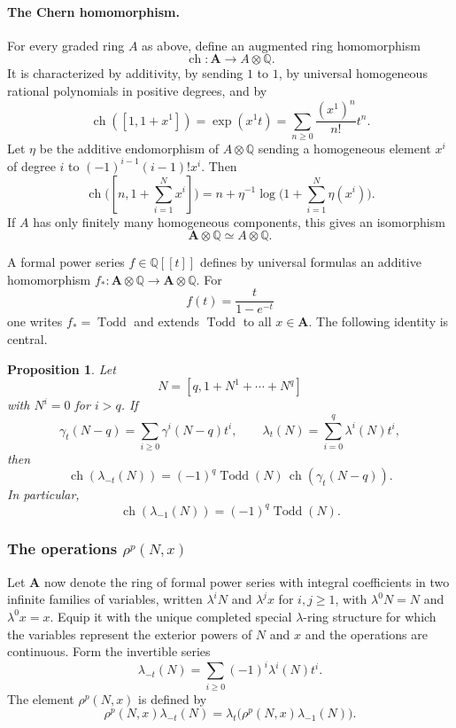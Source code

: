 \documentclass[11pt]{article}
\theoremstyle{plain}
\newtheorem*{proposition*}{Proposition}
\theoremstyle{definition}
\theoremstyle{remark}
\newcommand{\QQ}{\mathbb Q}
\providecommand{\ch}{\operatorname{ch}}
\providecommand{\Todd}{\operatorname{Todd}}
\begin{document}
\paragraph{The Chern homomorphism.}
For every graded ring $A$ as above, define an augmented ring homomorphism
\begin{equation}\label{eq:chernhom}
   \ch:\mathbf A\to A\otimes\QQ.
\end{equation}
It is characterized by additivity, by sending $1$ to $1$, by universal homogeneous rational polynomials in positive degrees, and by
\begin{equation}\label{eq:chlinear}
   \ch([1,1+x^1])=\exp(x^1t)=\sum_{n\geq0}\frac{(x^1)^n}{n!}t^n.
\end{equation}
Let $\eta$ be the additive endomorphism of $A\otimes\QQ$ sending a homogeneous element $x^i$ of degree $i$ to $(-1)^{i-1}(i-1)!x^i$. Then
\begin{equation}\label{eq:chexplicit}
   \ch\bigl([n,1+\sum_{i=1}^{N}x^i]\bigr)
   =n+\eta^{-1}\log\bigl(1+\sum_{i=1}^{N}\eta(x^i)\bigr).
\end{equation}
If $A$ has only finitely many homogeneous components, this gives an isomorphism
\[
   \mathbf A\otimes\QQ\simeq A\otimes\QQ.
\]

A formal power series $f\in\QQ[[t]]$ defines by universal formulas an additive homomorphism $f_*:\mathbf A\otimes\QQ\to\mathbf A\otimes\QQ$. For
\[
   f(t)=\frac{t}{1-e^{-t}}
\]
one writes $f_* = \Todd$ and extends $\Todd$ to all $x\in\mathbf A$. The following identity is central.

\begin{proposition*}
Let
\[
   N=[q,1+N^1+\cdots+N^q]
\]
with $N^i=0$ for $i>q$. If
\[
\gamma_t(N-q)=\sum_{i\geq0}\gamma^i(N-q)t^i,
\qquad
\lambda_t(N)=\sum_{i=0}^q\lambda^i(N)t^i,
\]
then
\begin{equation}\label{eq:toddgamma}
   \ch(\lambda_{-t}(N))=(-1)^q\Todd(N)\,\ch(\gamma_t(N-q)).
\end{equation}
In particular,
\begin{equation}\label{eq:toddminusone}
   \ch(\lambda_{-1}(N))=(-1)^q\Todd(N).
\end{equation}
\end{proposition*}

\subsubsection{The operations $\rho^p(N,x)$}

Let $\mathbf A$ now denote the ring of formal power series with integral coefficients in two infinite families of variables, written $\lambda^iN$ and $\lambda^jx$ for $i,j\geq1$, with $\lambda^0N=N$ and $\lambda^0x=x$. Equip it with the unique completed special $\lambda$-ring structure for which the variables represent the exterior powers of $N$ and $x$ and the operations are continuous. Form the invertible series
\[
   \lambda_{-t}(N)=\sum_{i\geq0}(-1)^i\lambda^i(N)t^i.
\]
The element $\rho^p(N,x)$ is defined by
\begin{equation}\label{eq:rho}
   \rho^p(N,x)\lambda_{-t}(N)
   =\lambda_t\bigl(\rho^p(N,x)\lambda_{-1}(N)\bigr).
\end{equation}
\end{document}
